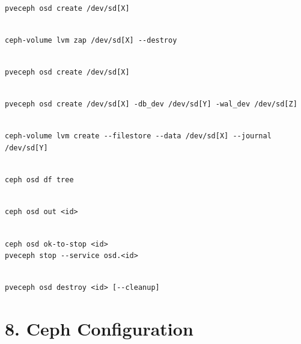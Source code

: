 \begin{lstlisting}

pveceph osd create /dev/sd[X]

\end{lstlisting}

\begin{lstlisting}

ceph-volume lvm zap /dev/sd[X] --destroy

\end{lstlisting}

\begin{lstlisting}

pveceph osd create /dev/sd[X]

\end{lstlisting}

\begin{lstlisting}

pveceph osd create /dev/sd[X] -db_dev /dev/sd[Y] -wal_dev /dev/sd[Z]

\end{lstlisting}

\begin{lstlisting}

ceph-volume lvm create --filestore --data /dev/sd[X] --journal /dev/sd[Y]

\end{lstlisting}

\begin{lstlisting}

ceph osd df tree

\end{lstlisting}

\begin{lstlisting}

ceph osd out <id>

\end{lstlisting}

\begin{lstlisting}

ceph osd ok-to-stop <id>
pveceph stop --service osd.<id>

\end{lstlisting}

\begin{lstlisting}

pveceph osd destroy <id> [--cleanup]

\end{lstlisting}


\section{8. Ceph Configuration}

